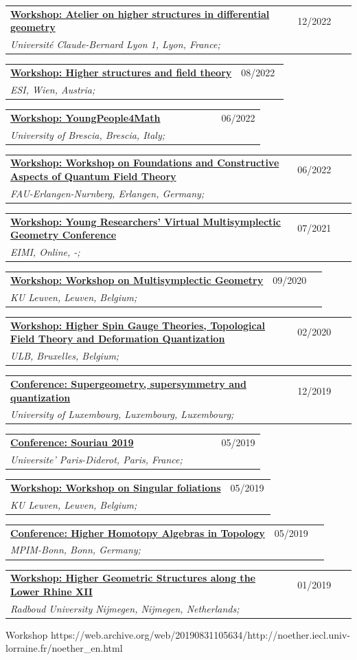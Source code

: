 \documentclass[a4paper]{article}
\newcommand{\longvoice}[8]{
	\begin{tabular}{p{0.83\linewidth} p{0.17\linewidth} }
		\textbf{\href{#3}{#2: #1}} & #4 
		\\ 
		\textit{#5, #6, #7;} & {\small\emph{#8}}
	\end{tabular}
	\vspace{.5em}
}
\begin{document}
		{}
	\longvoice{Atelier on higher structures in differential geometry}
		{Workshop}
		{https://ryvkin.eu/atelier2022/}
		{12/2022}
		{Université Claude-Bernard Lyon 1}
		{Lyon}
		{France}
		{}
	\longvoice{Higher structures and field theory}
		{Workshop}
		{https://www.esi.ac.at/events/e430/}
		{08/2022}
		{ESI}
		{Wien}
		{Austria}
		{}
	\longvoice{YoungPeople4Math}
		{Workshop}
		{https://www.dropbox.com/s/2elzcczx7m0o9zf/2206-Brescia-YoungPeople4Math.pdf?dl=0}
		{06/2022}
		{University of Brescia}
		{Brescia}
		{Italy}
		{}
	\longvoice{Workshop on Foundations and Constructive Aspects of Quantum Field Theory}
		{Workshop}
		{https://en.www.math.fau.de/mathematical-physics/gandalf-lechner/events10056/workshop-lqp46/}
		{06/2022}
		{FAU-Erlangen-Nurnberg}
		{Erlangen}
		{Germany}
		{}
	\longvoice{Young Researchers' Virtual Multisymplectic Geometry Conference}
		{Workshop}
		{https://public.eimi.ru/~cblacker/yrvmgc_21.html}
		{07/2021}
		{EIMI}
		{Online}
		{-}
		{}
	\longvoice{Workshop on Multisymplectic Geometry}
		{Workshop}
		{https://wis.kuleuven.be/events/archive/multisymplectic}
		{09/2020}
		{KU Leuven}
		{Leuven}
		{Belgium}
		{}
	\longvoice{Higher Spin Gauge Theories, Topological Field Theory and Deformation Quantization}
		{Workshop}
		{http://www.solvayinstitutes.be/event/workshop/higher_spin_2020/higher_spin_2020.html}
		{02/2020}
		{ULB}
		{Bruxelles}
		{Belgium}
		{}
	\longvoice{Supergeometry, supersymmetry and quantization}
		{Conference}
		{http://math.uni.lu/SuperWork/SuperConference.html}
		{12/2019}
		{University of Luxembourg}
		{Luxembourg}
		{Luxembourg}
		{}
	\longvoice{Souriau 2019}
		{Conference}
		{https://web.archive.org/web/20190831102558/http://souriau2019.fr/?page_id=2}
		{05/2019}
		{Universite' Paris-Diderot}
		{Paris}
		{France}
		{}
	\longvoice{Workshop on Singular foliations}
		{Workshop}
		{https://wis.kuleuven.be/agenda/sem-geometry/sem-geometry-upcoming}
		{05/2019}
		{KU Leuven}
		{Leuven}
		{Belgium}
		{}
	\longvoice{Higher Homotopy Algebras in Topology}
		{Conference}
		{https://web.archive.org/web/20190831103619/https://www.mpim-bonn.mpg.de/node/9245}
		{05/2019}
		{MPIM-Bonn}
		{Bonn}
		{Germany}
		{}
	\longvoice{Higher Geometric Structures along the Lower Rhine XII}
		{Workshop}
		{https://web.archive.org/web/20190831103524/https://www.math.ru.nl/~sagave/higher-structures-XII/}
		{01/2019}
		{Radboud University Nijmegen}
		{Nijmegen}
		{Netherlands}
		{}
		{Workshop}
		{https://web.archive.org/web/20190831105634/http://noether.iecl.univ-lorraine.fr/noether_en.html}
\end{document}
